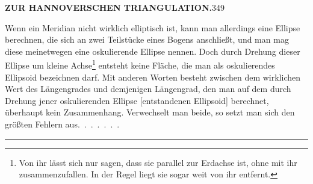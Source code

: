 \clearpage
\noindent\textbf{ZUR HANNOVERSCHEN TRIANGULATION.}\hfill349
\par\medskip
\begingroup
\makeatletter
\renewcommand{\@makefnmark}{\hbox{\normalfont\textsuperscript{*})}}
\makeatother
Wenn ein Meridian nicht wirklich elliptisch ist, kann man allerdings
eine Ellipse berechnen, die sich an zwei Teilstücke eines Bogens anschließt, und
man mag diese meinetwegen eine oskulierende Ellipse nennen. Doch durch
Drehung dieser Ellipse um  kleine Achse\footnote{\hspace{.25em}Von ihr lässt sich nur sagen, dass sie parallel zur Erdachse ist, ohne mit ihr zusammenzufallen. In der Regel liegt sie sogar weit von ihr entfernt.} entsteht keine Fläche, die
man als oskulierendes Ellipsoid bezeichnen darf. Mit anderen Worten besteht zwischen
dem wirklichen Wert des Längengrades und demjenigen Längengrad, den man
auf dem durch Drehung jener oskulierenden Ellipse [entstandenen Ellipsoid]
berechnet, überhaupt kein Zusammenhang. Verwechselt man beide, so setzt
man sich den größten Fehlern aus.\ .\ .\ .\ .\ .\ .
\endgroup
\begin{center}\rule{.26\linewidth}{.4pt}\end{center}

